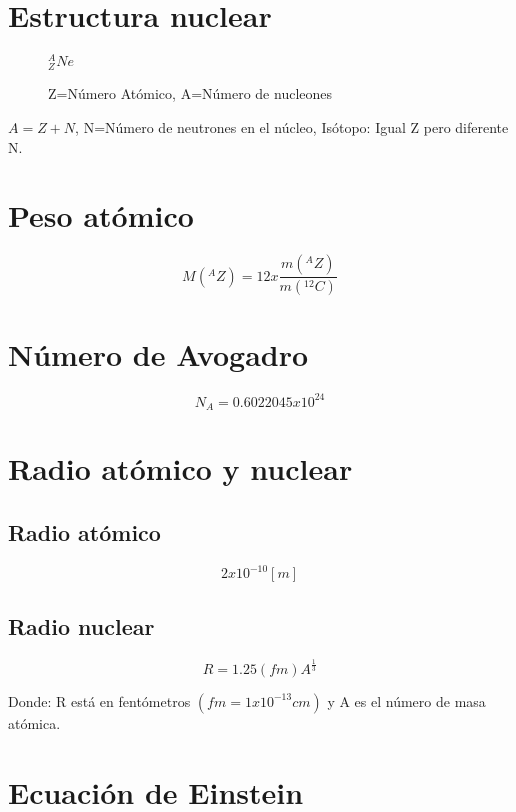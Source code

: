 \documentclass[]{article}
\begin{document}
\section{Estructura nuclear}

\begin{figure}
	\centering
	$^A_ZNe$
	\caption{Z=Número Atómico, A=Número de nucleones
}
\end{figure}


	$A= Z+N$,	N=Número de neutrones en el núcleo, Isótopo: Igual Z pero diferente N.

\section{Peso atómico}

\begin{equation}
   M(^AZ)=12x\frac{m(^AZ)}{m(^{12}C)}
\end{equation}

\section{Número de Avogadro}

\begin{equation}
    N_A= 0.6022045 x 10^{24}
\end{equation}

\section{Radio atómico y nuclear}

\subsection{Radio atómico}

\begin{equation}
  2x10^{-10}[m]
\end{equation}

\subsection{Radio nuclear}

\begin{equation}
R = 1.25(fm)A^{\frac{1}{3}} 
\end{equation}

Donde: R está en fentómetros $(fm = 1 x 10^{-13}cm)$ y A es
el número de masa atómica.

\section{Ecuación de Einstein}
\end{document}
